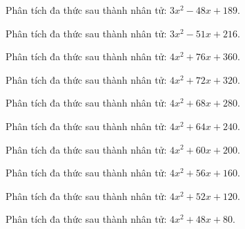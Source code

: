\begin{bt}
	Phân tích đa thức sau thành nhân tử: $3 x^2 - 48 x + 189$.
\end{bt}
\begin{bt}
	Phân tích đa thức sau thành nhân tử: $3 x^2 - 51 x + 216$.
\end{bt}
\begin{bt}
	Phân tích đa thức sau thành nhân tử: $4 x^2 + 76 x + 360$.
\end{bt}
\begin{bt}
	Phân tích đa thức sau thành nhân tử: $4 x^2 + 72 x + 320$.
\end{bt}
\begin{bt}
	Phân tích đa thức sau thành nhân tử: $4 x^2 + 68 x + 280$.
\end{bt}
\begin{bt}
	Phân tích đa thức sau thành nhân tử: $4 x^2 + 64 x + 240$.
\end{bt}
\begin{bt}
	Phân tích đa thức sau thành nhân tử: $4 x^2 + 60 x + 200$.
\end{bt}
\begin{bt}
	Phân tích đa thức sau thành nhân tử: $4 x^2 + 56 x + 160$.
\end{bt}
\begin{bt}
	Phân tích đa thức sau thành nhân tử: $4 x^2 + 52 x + 120$.
\end{bt}
\begin{bt}
	Phân tích đa thức sau thành nhân tử: $4 x^2 + 48 x + 80$.
\end{bt}
